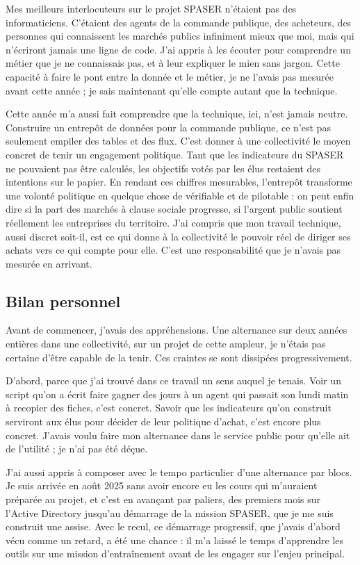 \documentclass[11pt,a4paper]{article}
\begin{document}
Mes meilleurs interlocuteurs sur le projet SPASER n'étaient pas des informaticiens. C'étaient des agents de la commande publique, des acheteurs, des personnes qui connaissent les marchés publics infiniment mieux que moi, mais qui n'écriront jamais une ligne de code. J'ai appris à les écouter pour comprendre un métier que je ne connaissais pas, et à leur expliquer le mien sans jargon. Cette capacité à faire le pont entre la donnée et le métier, je ne l'avais pas mesurée avant cette année ; je sais maintenant qu'elle compte autant que la technique.

Cette année m'a aussi fait comprendre que la technique, ici, n'est jamais neutre. Construire un entrepôt de données pour la commande publique, ce n'est pas seulement empiler des tables et des flux. C'est donner à une collectivité le moyen concret de tenir un engagement politique. Tant que les indicateurs du SPASER ne pouvaient pas être calculés, les objectifs votés par les élus restaient des intentions sur le papier. En rendant ces chiffres mesurables, l'entrepôt transforme une volonté politique en quelque chose de vérifiable et de pilotable : on peut enfin dire si la part des marchés à clause sociale progresse, si l'argent public soutient réellement les entreprises du territoire. J'ai compris que mon travail technique, aussi discret soit-il, est ce qui donne à la collectivité le pouvoir réel de diriger ses achats vers ce qui compte pour elle. C'est une responsabilité que je n'avais pas mesurée en arrivant.

\subsection*{Bilan personnel}
Avant de commencer, j'avais des appréhensions. Une alternance sur deux années entières dans une collectivité, sur un projet de cette ampleur, je n'étais pas certaine d'être capable de la tenir. Ces craintes se sont dissipées progressivement.

D'abord, parce que j'ai trouvé dans ce travail un sens auquel je tenais. Voir un script qu'on a écrit faire gagner des jours à un agent qui passait son lundi matin à recopier des fiches, c'est concret. Savoir que les indicateurs qu'on construit serviront aux élus pour décider de leur politique d'achat, c'est encore plus concret. J'avais voulu faire mon alternance dans le service public pour qu'elle ait de l'utilité ; je n'ai pas été déçue.

J'ai aussi appris à composer avec le tempo particulier d'une alternance par blocs. Je suis arrivée en août 2025 sans avoir encore eu les cours qui m'auraient préparée au projet, et c'est en avançant par paliers, des premiers mois sur l'Active Directory jusqu'au démarrage de la mission SPASER, que je me suis construit une assise. Avec le recul, ce démarrage progressif, que j'avais d'abord vécu comme un retard, a été une chance : il m'a laissé le temps d'apprendre les outils sur une mission d'entraînement avant de les engager sur l'enjeu principal.
\end{document}
